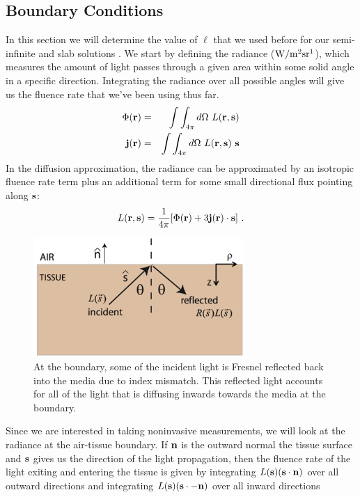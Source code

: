 \subsection{Boundary Conditions}
In this section we will determine the value of $\ell$ that we used before for our semi-infinite and slab solutions \cite{haskell_94_1}. We start by defining the radiance ($\rm{W/m^2sr^1}$), which measures the amount of light passes through a given area within some solid angle in a specific direction. Integrating the radiance over all possible angles will give us the fluence rate that we've been using thus far. 
\begin{eqnarray}
\Phi({\bf r}) &=& \int\int_{4\pi} d\Omega \ L({\bf r},{\bf s})\\
{\bf j}({\bf r}) &=& \int\int_{4\pi} d\Omega \ L({\bf r},{\bf s}) \ {\bf s}
\end{eqnarray}
In the diffusion approximation, the radiance can be approximated by an isotropic fluence rate term plus an additional term for some small directional flux pointing along ${\bf s}$:
\begin{equation}
\label{Radiance}
L({\bf r},{\bf s}) = \frac{1}{4\pi} [ \Phi({\bf r}) + 3 {\bf j}({\bf
  r}) \cdot {\bf s}] \ .
\end{equation}
\begin{figure}[h]
\centering
\includegraphics[width=8cm]{./figures/2_Theory/BoundaryReflect.png}
\caption{At the boundary, some of the incident light is Fresnel reflected back into the media due to index mismatch. This reflected light accounts for all of the light that is diffusing inwards towards the media at the boundary.}
\label{BoundaryReflect}
\end{figure}
Since we are interested in taking noninvasive measurements, we will look at the radiance at the air-tissue boundary. If ${\bf n}$ is the outward normal the tissue surface and ${\bf s}$ gives us the direction of the light propagation, then the fluence rate of the light exiting and entering the tissue is given by integrating $L({\bf s}) ({\bf s} \cdot {\bf n})$ over all outward directions and integrating  $L({\bf s}) ({\bf s} \cdot {- \bf n})$ over all inward directions
